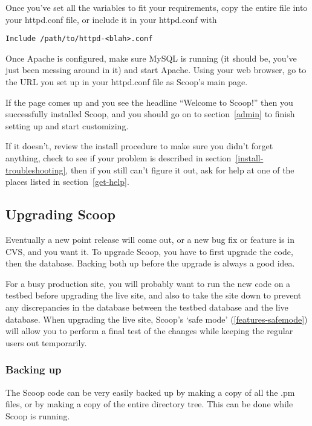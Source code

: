 Once you've set all the variables to fit your requirements, copy the entire file into your httpd.conf file, or include it in your httpd.conf with

\begin{verbatim}
Include /path/to/httpd-<blah>.conf
\end{verbatim}

Once Apache is configured, make sure MySQL is running (it should be, you've just been messing around in it) and start Apache.  Using your web browser, go to the URL you set up in your httpd.conf file as Scoop's main page.

If the page comes up and you see the headline ``Welcome to Scoop!'' then you successfully installed Scoop, and you should go on to section~\ref{admin} to finish setting up and start customizing.

If it doesn't, review the install procedure to make sure you didn't forget anything, check to see if your problem is described in section~\ref{install-troubleshooting}, then if you still can't figure it out, ask for help at one of the places listed in section~\ref{get-help}.

\subsection{Upgrading Scoop}
\label{upgrading}

Eventually a new point release will come out, or a new bug fix or feature is in CVS, and you want it.  To upgrade Scoop, you have to first upgrade the code, then the database.  Backing both up before the upgrade is always a good idea.

For a busy production site, you will probably want to run the new code on a testbed before upgrading the live site, and also to take the site down to prevent any discrepancies in the database between the testbed database and the live database. When upgrading the live site, Scoop's `safe mode' (\ref{features-safemode}) will allow you to perform a final test of the changes while keeping the regular users out temporarily.

\subsubsection{Backing up}
\label{backup}

The Scoop code can be very easily backed up by making a copy of all the .pm files, or by making a copy of the entire directory tree.  This can be done while Scoop is running.

